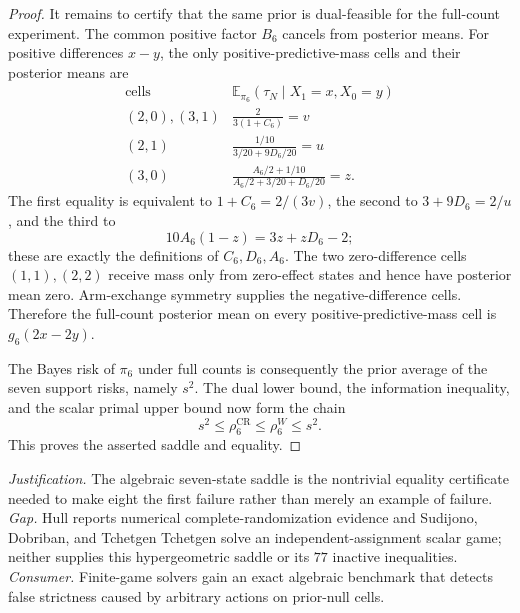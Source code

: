 \documentclass{article}
\begin{document}
\begin{proof}
It remains to certify that the same prior is dual-feasible for the full-count experiment.  The common positive factor \(B_6\) cancels from posterior means.  For positive differences \(x-y\), the only positive-predictive-mass cells and their posterior means are
\[
\begin{array}{c|c}
\text{cells}&\mathbb E_{\pi_6}(\tau_N\mid X_1=x,X_0=y)\\ \hline
(2,0),(3,1)&\displaystyle\frac{2}{3(1+C_6)}=v\\[3pt]
(2,1)&\displaystyle\frac{1/10}{3/20+9D_6/20}=u\\[3pt]
(3,0)&\displaystyle\frac{A_6/2+1/10}{A_6/2+3/20+D_6/20}=z.
\end{array}
\]
The first equality is equivalent to \(1+C_6=2/(3v)\), the second to \(3+9D_6=2/u\), and the third to
\[
 10A_6(1-z)=3z+zD_6-2;
\]
these are exactly the definitions of \(C_6,D_6,A_6\).  The two zero-difference cells \((1,1),(2,2)\) receive mass only from zero-effect states and hence have posterior mean zero.  Arm-exchange symmetry supplies the negative-difference cells.  Therefore the full-count posterior mean on every positive-predictive-mass cell is \(g_6(2x-2y)\).

The Bayes risk of \(\pi_6\) under full counts is consequently the prior average of the seven support risks, namely \(s^2\).  The dual lower bound, the information inequality, and the scalar primal upper bound now form the chain
\[
 s^2\leq\rho_6^{\mathrm{CR}}\leq\rho_6^W\leq s^2.
\]
This proves the asserted saddle and equality.
\end{proof}
\par\smallskip\noindent \textit{Justification.} The algebraic seven-state saddle is the nontrivial equality certificate needed to make eight the first failure rather than merely an example of failure. \textit{Gap.} Hull reports numerical complete-randomization evidence and Sudijono, Dobriban, and Tchetgen Tchetgen solve an independent-assignment scalar game; neither supplies this hypergeometric saddle or its \(77\) inactive inequalities. \textit{Consumer.} Finite-game solvers gain an exact algebraic benchmark that detects false strictness caused by arbitrary actions on prior-null cells.
\end{document}
